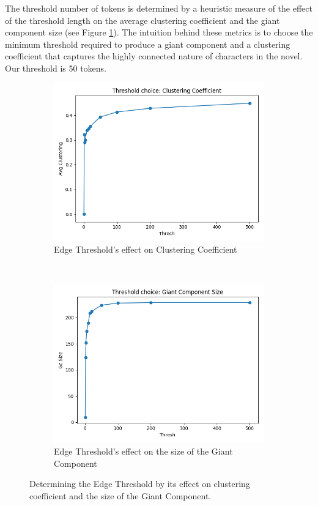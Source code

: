 The threshold number of tokens is determined by a heuristic measure of the effect of the threshold length on the average clustering coefficient and the giant component size (see Figure \ref{fig-threshold-size}). The intuition behind these metrics is to choose the minimum threshold required to produce a giant component and a clustering coefficient that captures the highly connected nature of characters in the novel. Our threshold is 50 tokens.

\begin{figure}[ht]
    \centering
    \begin{subfigure}{0.4\textwidth}
        \includegraphics[width=1.\textwidth]{images/thresh_vs_avg_clustering.png}
        \caption{Edge Threshold's effect on Clustering Coefficient}
    \end{subfigure}
    \\
    \begin{subfigure}{0.4\textwidth}
        \includegraphics[width=1.\textwidth]{images/thresh_vs_gc_size.png}
        \caption{Edge Threshold's effect on the size of the Giant Component}
    \end{subfigure}
    \caption{Determining the Edge Threshold by its effect on clustering coefficient and the size of the Giant Component.}
    \label{fig-threshold-size}
\end{figure}

